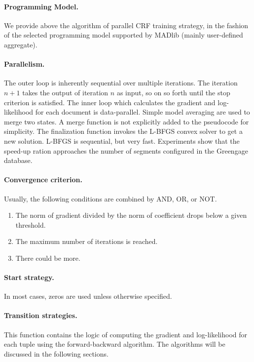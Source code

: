 \paragraph{Programming Model.}
We provide above the algorithm of parallel CRF training strategy, in the fashion of the selected programming model supported by MADlib (mainly user-defined aggregate).

\paragraph{Parallelism.}
The outer loop is inherently sequential over multiple iterations.
The iteration $n+1$ takes the output of iteration $n$ as input, so on so forth until the stop criterion is satisfied.
The inner loop which calculates the gradient and log-likelihood for each document is data-parallel.
Simple model averaging are used to merge two states.
A merge function is not explicitly added to the pseudocode for simplicity.
The finalization function invokes the L-BFGS convex solver to get a new solution. L-BFGS is sequential, but very fast.
Experiments show that the speed-up ration approaches the number of segments configured in the Greengage database.

\paragraph{Convergence criterion.}
Usually, the following conditions are combined by AND, OR, or NOT.
\begin{enumerate}
    \item The norm of gradient divided by the norm of coefficient drops below a given threshold.
    \item The maximum number of iterations is reached.
    \item There could be more.
\end{enumerate}

\paragraph{Start strategy.}
In most cases, zeros are used unless otherwise specified.

\paragraph{Transition strategies.}
This function contains the logic of computing the gradient and log-likelihood for each tuple using the forward-backward
algorithm. The algorithms will be discussed in the following sections.

